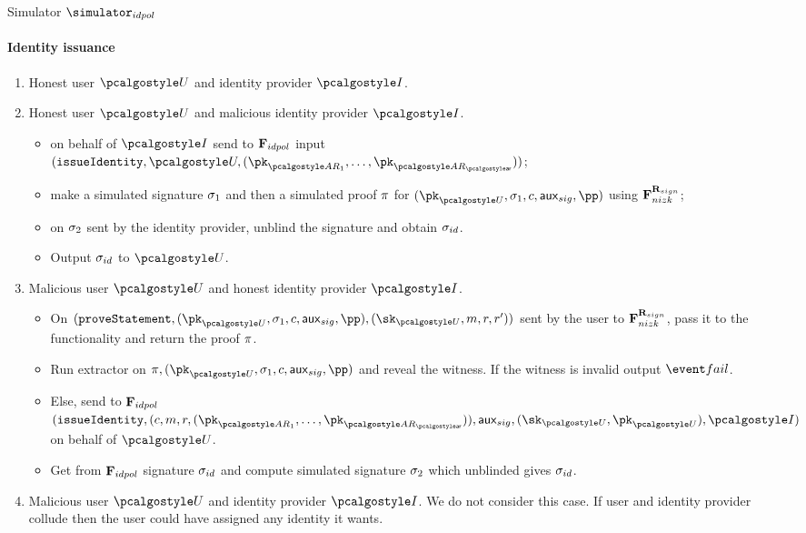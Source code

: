 \documentclass[runningheads,10pt]{llncs}
\numberwithin{equation}{section}
\begin{document}
\begin{simbox}{Simulator $\simulator_{idpol}$}
  \paragraph{Identity issuance}
  \begin{enumerate}
  \item Honest user $\user$ and identity provider $\idprov$. 
\item Honest user $\user$ and malicious identity provider $\idprov$.
  \begin{itemize}
  \item on behalf of $\idprov$ send to $\mathbf{F}_{{idpol}}$ input $(\issueIdentity, \user,
    (\pk_{\ar_1}, \ldots, \pk_{\ar_\noofar}))$;
  \item make a simulated signature $\sigma_1$ and then a simulated proof
    $\mathsf{\pi}$ for $(\pk_{\user}, \signature_1, c, \aux_{sig}, \pp)$ using
    $\mathbf{F}_{{nizk}}^{\mathbf{R}_{sign}}$;
  \item on $\sigma_2$ sent by the identity provider, unblind the signature and
    obtain $\sigma_{id}$.
  \item Output $\sigma_{id}$ to $\user$.
  \end{itemize}
  \item Malicious user $\user$ and honest identity provider $\idprov$.
    \begin{itemize}
    \item On $(\proveStatement, (\pk_{\user}, \signature_1, c, \aux_{sig}, \pp),
      (\sk_{\user}, m, r, r'))$ sent by the user to $\mathbf{F}_{{nizk}}^{\mathbf{R}_{sign}}$, pass
      it to the functionality and return the proof $\mathsf{\pi}$.
    \item Run extractor on $\zkproof, (\pk_{\user}, \signature_1, c, \aux_{sig},
      \pp)$ and reveal the witness. If the witness is invalid output $\fail$.
    \item Else, send to $\mathbf{F}_{{idpol}}$ $(\issueIdentity, (c, m, r, (\pk_{\ar_1},
      \ldots, \pk_{\ar_{\noofar}})), \aux_{sig}, (\sk_{\user}, \pk_{\user}),
      \idprov)$ on behalf of $\user$.
    \item Get from $\mathbf{F}_{{idpol}}$ signature $\sigma_{id}$ and compute simulated
      signature $\sigma_2$ which unblinded gives
      $\sigma_{id}$. 
    \end{itemize}
  \item Malicious user $\user$ and identity provider $\idprov$. We do not consider
    this case. If user and identity provider collude then the user could have
    assigned any identity it wants.
  \end{enumerate}


\end{simbox}
\end{document}
